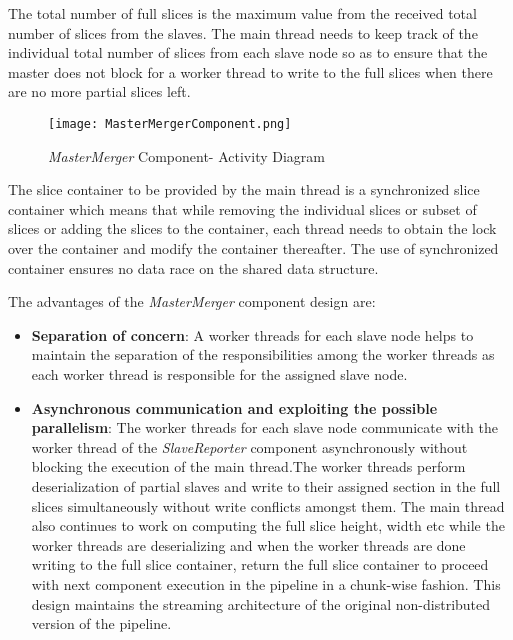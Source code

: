 The total number of full slices is the maximum value from the received total number of slices from the slaves. The main thread needs to keep track of the individual total number of slices from each slave node so as to ensure that the master does not block for a worker thread to write to the full slices when there are no more partial slices left. 

\begin{figure}[ht!]
\centering
\texttt{[image: MasterMergerComponent.png]}
\caption{\textit{MasterMerger} Component- Activity Diagram}
\label{fig:MasterMergerComponent}
\end{figure}

The slice container to be provided by the main thread is a synchronized slice container which means that while removing the individual slices or subset of slices or adding the slices to the container, each thread needs to obtain the lock over the container and modify the container thereafter. The use of synchronized container ensures no data race on the shared data structure. \newline 

The advantages of the \textit{MasterMerger} component design are:  
\begin{itemize}
\item \textbf{Separation of concern}: A worker threads for each slave node helps to maintain the separation of the responsibilities among the worker threads as each worker thread is responsible for the assigned slave node.
\item \textbf{Asynchronous communication and exploiting the possible parallelism}: The worker threads for each slave node communicate with the worker thread of the \textit{SlaveReporter} component asynchronously without blocking the execution of the main thread.The worker threads perform deserialization of partial slaves and write to their assigned section in the full slices simultaneously without write conflicts amongst them. The main thread also continues to work on computing the full slice height, width etc while the worker threads are deserializing and when the worker threads are done writing to the full slice container, return the full slice container to proceed with next  component execution in the pipeline in a chunk-wise fashion. This design maintains the streaming architecture of the original non-distributed version of the pipeline. 
\end{itemize}

